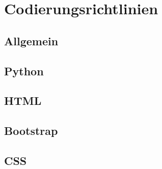 
\chapter{Codierungsrichtlinien}
\section{Allgemein}

\section{Python}
\section{HTML}
\section{Bootstrap}
\section{CSS}

